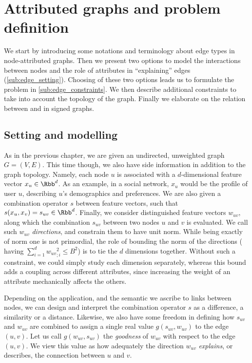 \section{Attributed graphs and problem definition}
\label{sec:edge_problem}

We start by introducing some notations and terminology about edge types in node-attributed graphs.
Then we present two options to model the interactions between nodes and the role of attributes in
\enquote{explaining} edges (\autoref{sub:edge_setting}). Choosing of these two options leads us to
formulate the \ecp{} problem in \autoref{sub:edge_constraints}. We then describe additional
constraints to take into account the topology of the graph. Finally we elaborate on the relation
between \ecp{} and \esp{} in signed graphs.

\subsection{Setting and modelling}
\label{sub:edge_setting}

As in the previous chapter, we are given an undirected, unweighted graph $G=(V,E)$. This
time though, we also have side information in addition to the graph topology. Namely, each node $u$
is associated with a $d$-dimensional feature vector $x_u \in \Rbb^d$. As an example, in a social
network, $x_u$ would be the profile of user $u$, describing $u$'s demographics and preferences. We
are also given a combination operator $s$ between feature vectors, such that $s(x_u, x_v) = s_{uv}
\in \Rbb^d$. Finally, we consider distinguished feature vectors $w_{uv}$,
along which the combination $s_{uv}$ between two nodes $u$ and $v$ is evaluated. We call such
$w_{uv}$ \emph{directions}, and constrain them to have unit norm.
While being exactly of norm one is not primordial, the role of bounding the norm of the directions
(\ie{} having $\sum_{i=1}^d {w_{uv}}_{;i}^2 \leq B^2$) is to tie the $d$ dimensions together.
Without such a constraint, we could simply study each dimension separately, whereas this bound
adds a coupling across different attributes, since increasing the weight of an attribute mechanically
affects the others.

Depending on the application, and the semantic we ascribe to links between nodes, we can design and
interpret the combination operator $s$ as a difference, a similarity or a distance. Likewise, we
also have some freedom in defining how $s_{uv}$ and $w_{uv}$ are combined to assign a single real
value $g(s_{uv}, w_{uv})$ to the edge $(u,v)$. Let us call $g(w_{uv}, s_{uv})$ the \emph{goodness}
of $w_{uv}$ with respect to the edge $(u,v)$. We view this value as how adequately the direction
$w_{uv}$ \emph{explains}, or describes, the connection between $u$ and $v$.


